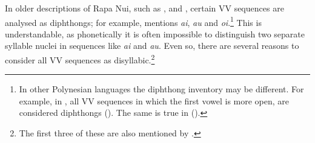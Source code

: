 In older descriptions of Rapa Nui, such as \citet{Englert1978}, \citet{Fuentes1960} and \citet{Salas1973}, certain VV sequences are analysed as diphthongs; for example, \citet[16]{Englert1978} mentions \textit{ai}, \textit{au} and \textit{oi}.\footnote{\label{fn:38}In other Polynesian languages the diphthong inventory may be different. For example, in , all VV sequences in which the first vowel is more open, are considered diphthongs (\citealt[5]{AcadémieTahitienne1986}). The same is true in  (\citealt[69]{Harlow2007Maori}).} This is understandable, as phonetically it is often impossible to distinguish two separate syllable nuclei in sequences like \textit{ai} and \textit{au}. Even so, there are several reasons to consider all VV sequences as disyllabic.\footnote{\label{fn:39}The first three of these are also mentioned by \citet{WeberWeber1982}.} 

